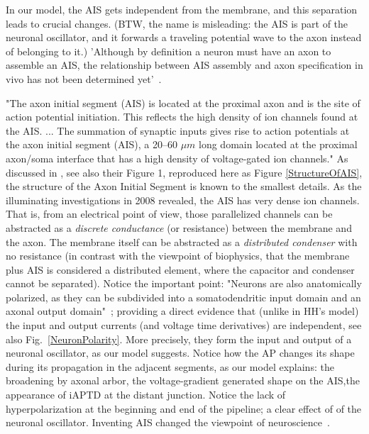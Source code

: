 In our model, the \gls{AIS} gets independent from the membrane,
and this separation leads to crucial changes. (BTW, the name is misleading:
the \gls{AIS} is part of the neuronal oscillator, and it forwards a traveling
potential wave to the axon instead of belonging to it.)
'Although by definition a neuron must have an
axon to assemble an AIS, the relationship between AIS
assembly and axon specification in vivo has not been
determined yet'~\cite{AIS_NeuronalPolarity:2010}.

"The axon initial segment (AIS) is located at the proximal axon and is the site of action potential initiation. This
reflects the high density of ion channels found at the AIS.
... The summation of
synaptic inputs gives rise to action potentials at the
axon initial segment (AIS), a 20--60 $\mu m$ long domain
located at the proximal axon/soma interface that has
a high density of voltage-gated ion channels."	
As discussed in \cite{AISStructureReview:2018}, see also their Figure 1, reproduced here as Figure \ref{StructureOfAIS},
the structure of the Axon Initial Segment
is known to the smallest details.
As the illuminating investigations in 2008
\cite{ActionPotentialGenerationNatrium:2008}
revealed, the \gls{AIS} has very dense ion channels. That is, from an electrical point
of view, those parallelized channels can be abstracted as a  \textit{discrete  conductance}
(or resistance) between the membrane and the axon.
The membrane itself can be abstracted as a \textit{distributed condenser} with no resistance
(in contrast with the viewpoint of biophysics, that the membrane  plus \gls{AIS}
is considered a distributed element, where the capacitor and condenser cannot be separated).
Notice the important point:
	"Neurons are also anatomically polarized, as they can be
subdivided into a somatodendritic input domain and an axonal output domain"~\cite{AIS_NeuronalPolarity:2010};
providing a direct evidence that (unlike in \gls{HH}'s
model) the input and output currents (and voltage time derivatives) are independent, see also Fig.~\ref{NeuronPolarity}.
More precisely, they form the input and output of a neuronal oscillator, as our model suggests. Notice how the 
\gls{AP}
changes its shape during its propagation in the adjacent segments, as our model explains: the broadening by axonal arbor, the voltage-gradient generated shape on the
\gls{AIS},the appearance of
iAPTD at the distant junction. Notice the lack of hyperpolarization at the beginning and end of the pipeline; a clear effect of of the neuronal oscillator.
Inventing 
AIS changed the viewpoint of neuroscience~\cite{AIS_Updated_Viewpoint:2018}.

